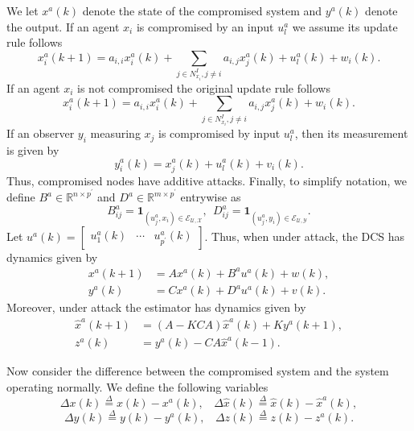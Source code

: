 \documentclass[letterpaper, 10 pt, conference]{ieeeconf}
\begin{document}
We let $x^a(k)$ denote the state of the compromised system and $y^a(k)$ denote the output. If an agent $x_i$ is compromised by an input $u_l^a$ we assume its update rule follows
\begin{equation}
x_i^a(k+1) = a_{i,i}x_i^a(k) + \sum_{j \in N_{x_i}^I, j \neq i} a_{i,j} x_j^a(k) + u_{l}^a(k) + w_{i}(k).
\end{equation}
If an agent $x_i$ is not compromised the original update rule follows
\begin{equation}
x_i^a(k+1) = a_{i,i}x_i^a(k) + \sum_{j \in N_{x_i}^I, j \neq i} a_{i,j} x_j^a(k)  + w_{i}(k).
\end{equation}
If an observer $y_i$ measuring $x_j$ is compromised by input $u_l^a$, then its measurement is given by
\begin{equation}
y_i^a(k) = x_j^a(k) + u_{l}^a(k) + v_i(k).
\end{equation}
Thus, compromised nodes have additive attacks. 
Finally, to simplify notation, we define $B^a \in \mathbb{R}^{n \times p^\prime}$ and $D^a \in \mathbb{R}^{m \times p^\prime}$ entrywise as 
\begin{equation}
B^a_{ij} = \mathbf{1}_{(u_j^a,x_i) \in \mathcal{E}_{\mathcal{U},\mathcal{X}}},~~ D^a_{ij} = \mathbf{1}_{(u_j^a,y_i) \in \mathcal{E}_{\mathcal{U}, \mathcal{Y}}}.
\end{equation}
Let $u^a(k) = \begin{bmatrix} u_1^a(k) & \cdots & u_{p^\prime}^a(k) \end{bmatrix}$. Thus, when under attack, the DCS has dynamics given by 
\begin{align}
x^a (k+1) &= A x^a(k) + B^a u^a(k) + w(k), \\
y^a(k) &= C x^a(k) + D^au^a(k) + v(k).
\end{align}
Moreover, under attack the estimator has dynamics given by
\begin{align}
\hat{x}^a(k+1) &= (A-KCA)\hat{x}^a(k) + Ky^a(k+1), \\
z^a(k) &= y^a(k) - CA\hat{x}^a(k-1). 
\end{align}

Now consider the difference between the compromised system and the system operating normally. We define the following variables
\begin{equation}
\Delta x(k) \stackrel {\Delta}{=} x(k) - x^a(k), ~~~~\Delta \hat{x}(k) \stackrel {\Delta}{=} \hat x(k) - \hat x^a(k),
\end{equation}
\begin{equation}
\Delta y(k) \stackrel {\Delta}{=} y(k) - y^a(k),~~~~\Delta {z}(k) \stackrel {\Delta}{=} z(k) - z^a(k).
\end{equation}
\end{document}
